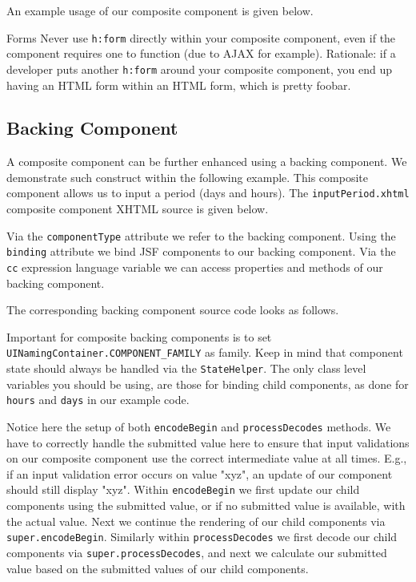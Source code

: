 An example usage of our composite component is given below.

\begin{TIP}{Forms}
Never use \texttt{h:form} directly within your composite component, even if the component requires one to function (due to AJAX for example).
Rationale: if a developer puts another \texttt{h:form} around your composite component, you end up having an HTML form within an HTML form, which is pretty foobar.
\end{TIP}

\subsection{Backing Component}
A composite component can be further enhanced using a backing component.
We demonstrate such construct within the following example.
This composite component allows us to input a period (days and hours).
The \texttt{inputPeriod.xhtml} composite component XHTML source is given below.

Via the \texttt{componentType} attribute we refer to the backing component.
Using the \texttt{binding} attribute we bind JSF components to our backing component.
Via the \texttt{cc} expression language variable we can access properties and methods of our backing component.

The corresponding backing component source code looks as follows.

Important for composite backing components is to set \texttt{UINamingContainer.COMPONENT\_FAMILY} as family.
Keep in mind that component state should always be handled via the \texttt{StateHelper}.
The only class level variables you should be using, are those for binding child components, as done for \texttt{hours} and \texttt{days} in our example code.

Notice here the setup of both \texttt{encodeBegin} and \texttt{processDecodes} methods.
We have to correctly handle the submitted value here to ensure that input validations on our composite component use the correct intermediate value at all times.
E.g., if an input validation error occurs on value "xyz", an update of our component should still display "xyz".
Within \texttt{encodeBegin} we first update our child components using the submitted value, or if no submitted value is available, with the actual value.
Next we continue the rendering of our child components via \texttt{super.encodeBegin}.
Similarly within \texttt{processDecodes} we first decode our child components via \texttt{super.processDecodes}, and next we calculate our submitted value based on the submitted values of our child components.

